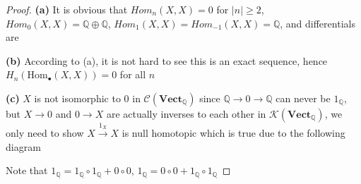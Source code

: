 \documentclass{article}
\theoremstyle{definition}
\theoremstyle{remark}
\theoremstyle{definition}
\begin{document}
\begin{proof}
\textbf{(a) }It is obvious that $Hom_n(X,X)=0$ for $|n|\geq 2$, $Hom_0(X,X)=\mathbb Q\oplus\mathbb Q$, $Hom_1(X,X)=Hom_{-1}(X,X)=\mathbb Q$, and differentials are
\begin{center}
\end{center}
\textbf{(b) }According to (a), it is not hard to see this is an exact sequence, hence $H_n(\mathrm{Hom}_\bullet(X,X))=0$ for all $n$ \par
\textbf{(c) }$X$ is not isomorphic to $0$ in $\mathscr C(\mathbf{Vect}_\mathbb{Q})$ since $\mathbb Q\to 0\to\mathbb Q$ can never be $1_\mathbb{Q}$, but $X\to0$ and $0\to X$ are actually inverses to each other in $\mathscr K(\mathbf{Vect}_\mathbb{Q})$, we only need to show $X\xrightarrow{1_X} X$ is null homotopic which is true due to the following diagram
\begin{center}
\end{center}
Note that $1_{\mathbb Q}=1_{\mathbb Q}\circ1_{\mathbb Q}+0\circ0$, $1_{\mathbb Q}=0\circ0+1_{\mathbb Q}\circ1_{\mathbb Q}$
\end{proof}
\end{document}
